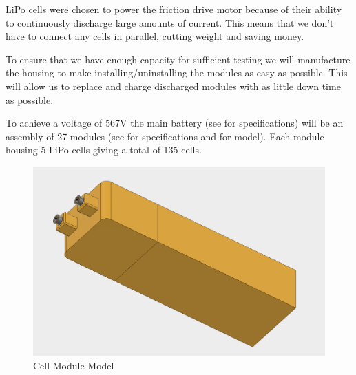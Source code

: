 \documentclass[main.tex]{subfiles}
\begin{document}
    LiPo cells were chosen to power the friction drive motor because of their ability to continuously discharge large amounts of current. This means that we don't have to connect any cells in parallel, cutting weight and saving money.



    To ensure that we have enough capacity for sufficient testing we will manufacture the housing to make installing/uninstalling the modules as easy as possible. This will allow us to replace and charge discharged modules with as little down time as possible.

    To achieve a voltage of 567V the main battery (see  for specifications) will be an assembly of 27 modules (see  for specifications and  for model). Each module housing 5 LiPo cells giving a total of 135 cells.\\

     \begin{figure}[H]
        \centering
        \includegraphics[width=\linewidth]{images/cell_module}
        \caption{Cell Module Model}
        \label{fig:module-model}
    \end{figure}
\end{document}
